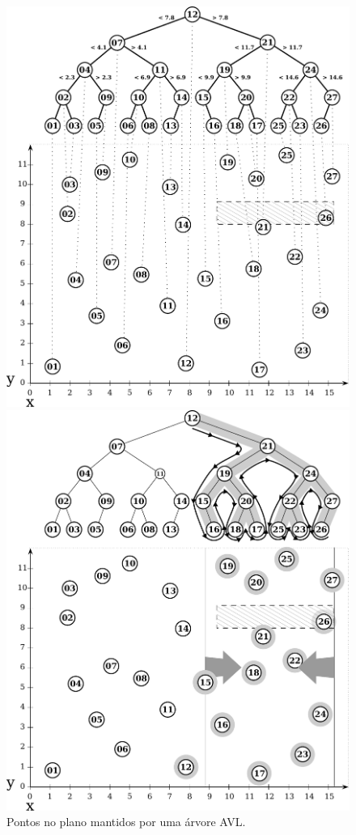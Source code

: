 \begin{figure}[ht]
  \centering
  \begin{minipage}[t]{0.48\textwidth}
    \includegraphics[width=\textwidth]{img/points-query/avl/points-avl-model}
    \caption{Pontos no plano mantidos por uma árvore AVL.}
    \label{img:pts-avl-model}
  \end{minipage}
  \hfill
  \begin{minipage}[t]{0.48\textwidth}
    \includegraphics[width=\textwidth]{img/points-query/avl/points-avl-query}

\end{minipage}
\end{figure}
